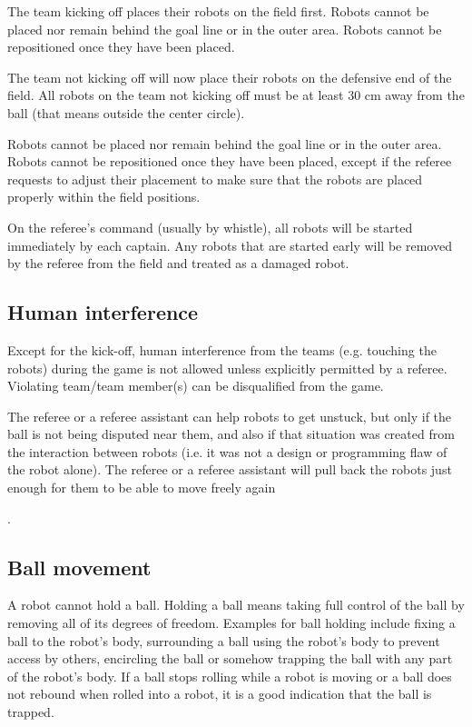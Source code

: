 \documentclass{article}
\begin{document}
The team kicking off places their robots on the field first. Robots cannot be placed nor remain behind the goal line or in the outer area. Robots cannot be repositioned once they have been placed.

The team not kicking off will now place their robots on the defensive end of the field. All robots on the team not kicking off must be at least 30 cm away from the ball (that means outside the center circle).

Robots cannot be placed nor remain behind the goal line or in the outer area. Robots cannot be repositioned once they have been placed, except if the referee requests to adjust their placement to make sure that the robots are placed properly within the field positions.

On the referee's command (usually by whistle), all robots will be started immediately by each captain. Any robots that are started early will be removed by the referee from the field and treated as a damaged robot.

\subsection{Human interference\label{ref-005}}

Except for the kick-off, human interference from the teams (e.g. touching the robots) during the game is not allowed unless explicitly permitted by a referee. Violating team/team member(s) can be disqualified from the game.

The referee or a referee assistant can help robots to get unstuck, but only if the ball is not being disputed near them, and also if that situation was created from the interaction between robots (i.e. it was not a design or programming flaw of the robot alone). The referee or a referee assistant will pull back the robots just enough for them to be able to move freely again

.

\subsection{Ball movement \label{ref-006}}

A robot cannot hold a ball. Holding a ball means taking full control of the ball by removing all of its degrees of freedom. Examples for ball holding include fixing a ball to the robot's body, surrounding a ball using the robot's body to prevent access by others, encircling the ball or somehow trapping the ball with any part of the robot's body. If a ball stops rolling while a robot is moving or a ball does not rebound when rolled into a robot, it is a good indication that the ball is trapped.
\end{document}
